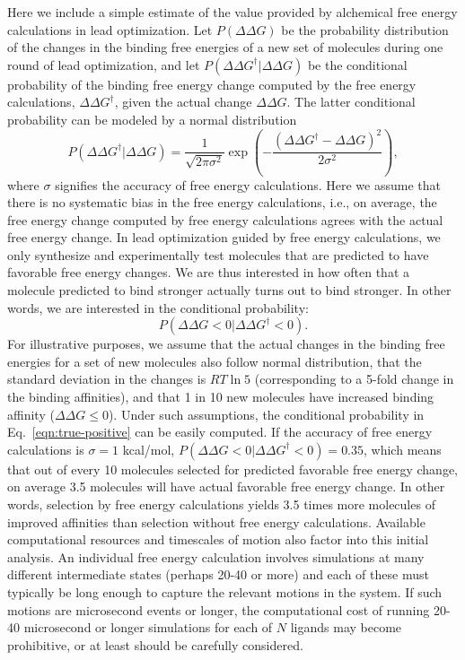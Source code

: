 \documentclass[9pt,bestpractices]{livecoms}
\begin{document}
Here we include a simple estimate of the value provided by alchemical
free energy calculations in lead optimization.  Let $P(\Delta\Delta
G)$ be the probability distribution of the changes in the binding free
energies of a new set of molecules during one round of lead
optimization, and let $P(\Delta\Delta G^\dagger|\Delta\Delta G)$ be the
conditional probability of the binding free energy change computed by
the free energy calculations, $\Delta\Delta G^\dagger$, given the actual
change $\Delta\Delta G$.  The latter conditional probability can be modeled
by a normal distribution
\begin{equation}
  P(\Delta\Delta G^\dagger|\Delta\Delta G) = \frac{1}{\sqrt{2\pi\sigma^2}}
  \exp\left(-\frac{(\Delta\Delta G^\dagger - \Delta\Delta G)^2}{2\sigma^2}\right),
  \label{eqn:free-energy-distribution}
\end{equation}
where $\sigma$ signifies the accuracy of free energy calculations.
Here we assume that there is no systematic bias in the free energy
calculations, i.e., on average, the free energy change computed by
free energy calculations agrees with the actual free energy change.
%
In lead optimization guided by free energy calculations, we only
synthesize and experimentally test molecules that are predicted to
have favorable free energy changes.  We are thus interested in how
often that a molecule predicted to bind stronger actually turns out to
bind stronger.  In other words, we are interested in the conditional
probability:
\begin{equation}
  P(\Delta\Delta G<0|\Delta\Delta G^\dagger<0).
  \label{eqn:true-positive}
\end{equation}
%
For illustrative purposes, we assume that the actual changes in the
binding free energies for a set of new molecules also follow normal
distribution, that the standard deviation in the changes is $RT\ln 5$
(corresponding to a 5-fold change in the binding affinities), and that
1 in 10 new molecules have increased binding affinity ($\Delta\Delta G
\leq 0$).  Under such assumptions, the conditional probability in
Eq.~\ref{eqn:true-positive} can be easily computed.  If the accuracy
of free energy calculations is $\sigma = 1$ kcal/mol, $P(\Delta\Delta
G<0|\Delta\Delta G^\dagger<0) = 0.35$, which means that out of every
10 molecules selected for predicted favorable free energy change, on
average 3.5 molecules will have actual favorable free energy change.
In other words, selection by free energy calculations yields 3.5 times
more molecules of improved affinities than selection without free
energy calculations.
%  
Available computational resources and timescales of motion also factor
into this initial analysis. An individual free energy calculation
involves simulations at many different intermediate states (perhaps
20-40 or more) and each of these must typically be long enough to
capture the relevant motions in the system. If such motions are
microsecond events or longer, the computational cost of running 20-40
microsecond or longer simulations for each of $N$ ligands may become
prohibitive, or at least should be carefully considered. 
%
\end{document}
